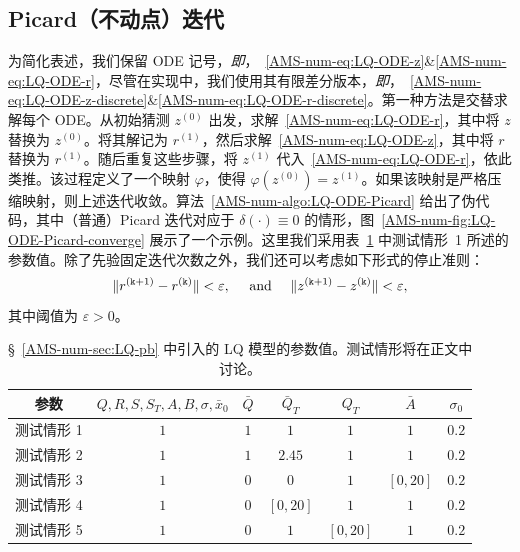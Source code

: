 \documentclass{amsproc}
\theoremstyle{definition}
\theoremstyle{remark}
\numberwithin{equation}{section}
\begin{document}
\subsection{Picard（不动点）迭代}

为简化表述，我们保留 ODE 记号，\textit{即}，~\eqref{AMS-num-eq:LQ-ODE-z}\&\eqref{AMS-num-eq:LQ-ODE-r}，尽管在实现中，我们使用其有限差分版本，\textit{即}，~\eqref{AMS-num-eq:LQ-ODE-z-discrete}\&\eqref{AMS-num-eq:LQ-ODE-r-discrete}。第一种方法是交替求解每个 ODE。从初始猜测 $z^{(0)}$ 出发，求解~\eqref{AMS-num-eq:LQ-ODE-r}，其中将 $z$ 替换为 $z^{(0)}$。将其解记为 $r^{(1)}$，然后求解~\eqref{AMS-num-eq:LQ-ODE-z}，其中将 $r$ 替换为 $r^{(1)}$。随后重复这些步骤，将 $z^{(1)}$ 代入~\eqref{AMS-num-eq:LQ-ODE-r}，依此类推。该过程定义了一个映射 $\varphi$，使得 $\varphi(z^{(0)}) = z^{(1)}$。如果该映射是严格压缩映射，则上述迭代收敛。算法~\ref{AMS-num-algo:LQ-ODE-Picard} 给出了伪代码，其中（普通）Picard 迭代对应于 $\delta(\cdot) \equiv 0$ 的情形，图~\ref{AMS-num-fig:LQ-ODE-Picard-converge} 展示了一个示例。这里我们采用表~\ref{AMS-num-tab:params-LQ-base} 中测试情形~1 所述的参数值。除了先验固定迭代次数之外，我们还可以考虑如下形式的停止准则：
$$
	\|r^{(\mathtt{k}+1)} - r^{(\mathtt{k})}\| < \varepsilon, \quad \hbox{ and } \quad \|z^{(\mathtt{k}+1)} - z^{(\mathtt{k})}\| < \varepsilon,
$$
其中阈值为 $\varepsilon>0$。





{\renewcommand{\arraystretch}{1.2}
\begin{table}[!ht]
\begin{center}
	\begin{tabular}{c|c|c|c|c|c|c}
				\hline
			参数 & $Q, R ,S ,S_T, A, B,\sigma, \bar x_0$ & $\bar Q$  & $\bar Q_T$   & $Q_T$ & $\bar A$ & $\sigma_0$	\\
			\hline
			 测试情形 1 & $1$ & $1$ & $1$ & $1$ & $1$ & $0.2$ \\
			\hline
			 测试情形 2 & $1$ & $1$ & $2.45$ & $1$ & $1$  & $0.2$ \\
			\hline
			 测试情形 3 & $1$ & $0$ & $0$ & $1$ & $[0,20]$ & $0.2$ \\
			 \hline
			 测试情形 4 & $1$ & $0$ & $[0,20]$ & $1$ & $1$ &  $0.2$ \\
			 \hline
			 测试情形 5 & $1$ & $0$ & $1$ & $[0,20]$ & $1$ &  $0.2$ \\
				 \hline 
				\end{tabular}
\caption{\S~\ref{AMS-num-sec:LQ-pb} 中引入的 LQ 模型的参数值。测试情形将在正文中讨论。}
\label{AMS-num-tab:params-LQ-base}
	\end{center}
\end{table}
}
\end{document}
